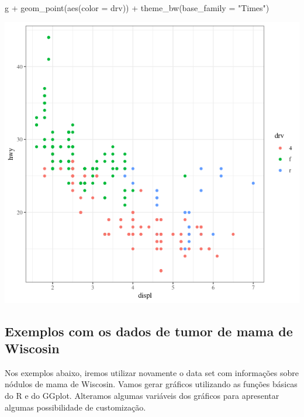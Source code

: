 \documentclass[
]{book}
\newenvironment{Shaded}{\begin{snugshade}}{\end{snugshade}}
\newcommand{\AttributeTok}[1]{\textcolor[rgb]{0.77,0.63,0.00}{#1}}
\newcommand{\FunctionTok}[1]{\textcolor[rgb]{0.00,0.00,0.00}{#1}}
\newcommand{\NormalTok}[1]{#1}
\newcommand{\SpecialCharTok}[1]{\textcolor[rgb]{0.00,0.00,0.00}{#1}}
\newcommand{\StringTok}[1]{\textcolor[rgb]{0.31,0.60,0.02}{#1}}
\begin{document}
\begin{Shaded}
\begin{Highlighting}[]
\NormalTok{g }\SpecialCharTok{+} \FunctionTok{geom\_point}\NormalTok{(}\FunctionTok{aes}\NormalTok{(}\AttributeTok{color =}\NormalTok{ drv)) }\SpecialCharTok{+} \FunctionTok{theme\_bw}\NormalTok{(}\AttributeTok{base\_family =} \StringTok{"Times"}\NormalTok{)}
\end{Highlighting}
\end{Shaded}

\includegraphics{figure/g18.png}

\hypertarget{exemplos-com-os-dados-de-tumor-de-mama-de-wiscosin}{%
\subsection{Exemplos com os dados de tumor de mama de Wiscosin}\label{exemplos-com-os-dados-de-tumor-de-mama-de-wiscosin}}

Nos exemplos abaixo, iremos utilizar novamente o data set com informações sobre nódulos de mama de Wiscosin. Vamos gerar gráficos utilizando as funções básicas do R e do GGplot. Alteramos algumas variáveis dos gráficos para apresentar algumas possibilidade de customização.
\end{document}
